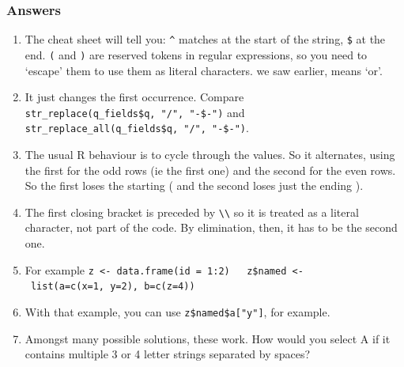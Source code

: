 \documentclass[
]{book}
\providecommand{\tightlist}{%
  \setlength{\itemsep}{0pt}\setlength{\parskip}{0pt}}
\begin{document}
\hypertarget{answers-14}{%
\subsubsection{Answers}\label{answers-14}}

\begin{enumerate}
\def\labelenumi{\arabic{enumi})}
\tightlist
\item
  The cheat sheet will tell you: \texttt{\^{}} matches at the start of the string, \texttt{\$} at the end. \texttt{(} and \texttt{)} are reserved tokens in regular expressions, so you need to `escape' them to use them as literal characters. \texttt{\textbar{}} we saw earlier, means `or'.
\item
  It just changes the first occurrence. Compare \texttt{str\_replace(q\_fields\$q,\ "/",\ "-\$-")} and \texttt{str\_replace\_all(q\_fields\$q,\ "/",\ "-\$-")}.
\item
  The usual R behaviour is to cycle through the values. So it alternates, using the first for the odd rows (ie the first one) and the second for the even rows. So the first loses the starting ( and the second loses just the ending ).
\item
  The first closing bracket is preceded by \texttt{\textbackslash{}\textbackslash{}} so it is treated as a literal character, not part of the code. By elimination, then, it has to be the second one.
\item
  For example \texttt{z\ \textless{}-\ data.frame(id\ =\ 1:2)\ \ \ z\$named\ \textless{}-\ list(a=c(x=1,\ y=2),\ b=c(z=4))}
\item
  With that example, you can use \texttt{z\$named\$a{[}"y"{]}}, for example.
\item
  Amongst many possible solutions, these work. How would you select A if it contains multiple 3 or 4 letter strings separated by spaces?
\end{enumerate}
\end{document}
